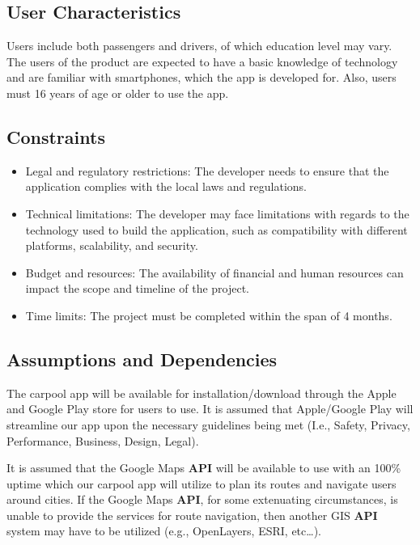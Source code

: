 \documentclass[]{article}
\begin{document}
\subsection{User Characteristics}
\label{sub:user_characteristics}
Users include both passengers and drivers, of which education level may vary. The users of the product are expected to have a basic knowledge of technology and are familiar with smartphones, which the app is developed for. Also, users must 16 years of age or older to use the app.

\subsection{Constraints}
\label{sub:constraints}
\begin{itemize}
	\item Legal and regulatory restrictions: The developer needs to ensure that the application complies with the local laws and regulations.
	\item Technical limitations: The developer may face limitations with regards to the technology used to build the application, such as compatibility with different platforms, scalability, and security.
	\item Budget and resources: The availability of financial and human resources can impact the scope and timeline of the project.
	\item Time limits: The project must be completed within the span of 4 months.
\end{itemize}

\subsection{Assumptions and Dependencies}
\label{sub:assumptions_and_dependencies}
The carpool app will be available for installation/download through the Apple and Google Play store for users to use. It is assumed that Apple/Google Play will streamline our app upon the necessary guidelines being met (I.e., Safety, Privacy, Performance, Business, Design, Legal).

It is assumed that the Google Maps \textbf{API} will be available to use with an 100\% uptime which our carpool app will utilize to plan its routes and navigate users around cities. If the Google Maps \textbf{API}, for some extenuating circumstances, is unable to provide the services for route navigation, then another GIS \textbf{API} system may have to be utilized (e.g., OpenLayers, ESRI, etc…).
\end{document}
